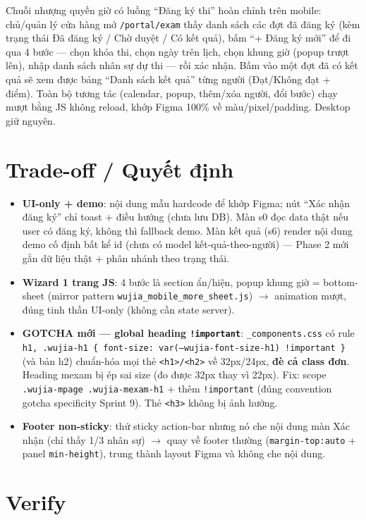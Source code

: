 Chuỗi nhượng quyền giờ có luồng ``Đăng ký thi'' hoàn chỉnh trên mobile: chủ/quản lý cửa hàng mở \texttt{/portal/exam} thấy danh sách các đợt đã đăng ký (kèm trạng thái Đã đăng ký / Chờ duyệt / Có kết quả), bấm ``+ Đăng ký mới'' để đi qua 4 bước --- chọn khóa thi, chọn ngày trên lịch, chọn khung giờ (popup trượt lên), nhập danh sách nhân sự dự thi --- rồi xác nhận. Bấm vào một đợt đã có kết quả sẽ xem được bảng ``Danh sách kết quả'' từng người (Đạt/Không đạt + điểm). Toàn bộ tương tác (calendar, popup, thêm/xóa người, đổi bước) chạy mượt bằng JS không reload, khớp Figma 100\% về màu/pixel/padding. Desktop giữ nguyên.

\section{Trade-off / Quyết định}

\begin{itemize}
  \item \textbf{UI-only + demo}: nội dung mẫu hardcode để khớp Figma; nút ``Xác nhận đăng ký'' chỉ toast + điều hướng (chưa lưu DB). Màn s0 đọc data thật nếu user có đăng ký, không thì fallback demo. Màn kết quả (s6) render nội dung demo cố định bất kể id (chưa có model kết-quả-theo-người) --- Phase 2 mới gắn dữ liệu thật + phân nhánh theo trạng thái.
  \item \textbf{Wizard 1 trang JS}: 4 bước là section ẩn/hiện, popup khung giờ = bottom-sheet (mirror pattern \texttt{wujia\_mobile\_more\_sheet.js}) $\rightarrow$ animation mượt, đúng tinh thần UI-only (không cần state server).
  \item \textbf{GOTCHA mới --- global heading \texttt{!important}}: \texttt{\_components.css} có rule \texttt{h1, .wujia-h1 \{ font-size: var(--wujia-font-size-h1) !important \}} (và bản h2) chuẩn-hóa mọi thẻ \texttt{<h1>/<h2>} về 32px/24px, \textbf{đè cả class đơn}. Heading mexam bị ép sai size (đo được 32px thay vì 22px). Fix: scope \texttt{.wujia-mpage .wujia-mexam-h1} + thêm \texttt{!important} (đúng convention gotcha specificity Sprint 9). Thẻ \texttt{<h3>} không bị ảnh hưởng.
  \item \textbf{Footer non-sticky}: thử sticky action-bar nhưng nó che nội dung màn Xác nhận (chỉ thấy 1/3 nhân sự) $\rightarrow$ quay về footer thường (\texttt{margin-top:auto} + panel \texttt{min-height}), trung thành layout Figma và không che nội dung.
\end{itemize}

\section{Verify}

